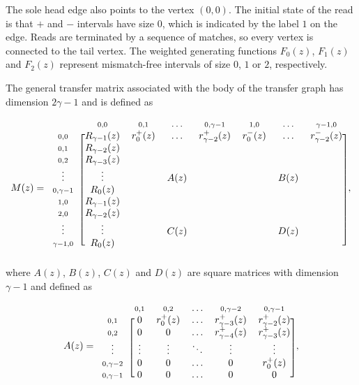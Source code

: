 \documentclass{article}
\begin{document}
The sole head edge also points to the vertex $(0,0)$. The initial state of
the read is that $+$ and $-$ intervals have size $0$, which is indicated
by the label $1$ on the edge. Reads are terminated by a sequence of
matches, so every vertex is connected to the tail vertex. The weighted
generating functions $F_0(z)$, $F_1(z)$ and $F_2(z)$ represent
mismatch-free intervals of size $0$, $1$ or $2$, respectively.

The general transfer matrix associated with the body of the transfer graph
has dimension $2\gamma-1$ and is defined as


\begin{equation*}
M(z) =
\begin{blockarray}{cccccccc}
   & \scriptstyle{0,0} & \scriptstyle{0,1} & 
    \ldots & \scriptstyle{0,\gamma-1} &
    \scriptstyle{1,0} & \ldots &
    \scriptstyle{\gamma-1,0}\\
\begin{block}{c[ccccccc]}
\scriptstyle{0,0} & R_{\gamma-1}(z)  & r_0^+(z) & \ldots &
    r_{\gamma-2}^+(z) & r_0^-(z) & \ldots & r_{\gamma-2}^-(z) \\
\scriptstyle{0,1} & R_{\gamma-2}(z) \\
\scriptstyle{0,2} & R_{\gamma-3}(z) \\
\vdots & \vdots & & A(z) & & & B(z) \\
\scriptstyle{0,\gamma-1} & R_0(z) \\
\scriptstyle{1,0} & R_{\gamma-1}(z) \\
\scriptstyle{2,0} & R_{\gamma-2}(z) \\
\vdots & \vdots & & C(z) & & & D(z) \\
\scriptstyle{\gamma-1,0} & R_0(z) \\
\end{block}
\end{blockarray},
\end{equation*}
where $A(z)$, $B(z)$, $C(z)$ and $D(z)$ are square matrices with dimension
$\gamma-1$ and defined as

\begin{equation*}
A(z) = 
\begin{blockarray}{cccccc}
   & \scriptstyle{0,1} & \scriptstyle{0,2} & \ldots &
    \scriptstyle{0,\gamma-2} & \scriptstyle{0,\gamma-1} \\
\begin{block}{c[ccccc]}
\scriptstyle{0,1} & 0 & r_0^+(z) & \ldots &
    r_{\gamma-3}^+(z) & r_{\gamma-2}^+(z) \\
\scriptstyle{0,2} & 0 & 0 & \ldots &
    r_{\gamma-4}^+(z) & r_{\gamma-3}^+(z) \\
\vdots & \vdots & \vdots & \ddots & \vdots & \vdots \\
\scriptstyle{0,\gamma-2} & 0 & 0 & \ldots & 0 & r_0^+(z) \\
\scriptstyle{0,\gamma-1} & 0 & 0 & \ldots & 0 & 0 \\
\end{block}
\end{blockarray},
\end{equation*}
\end{document}
